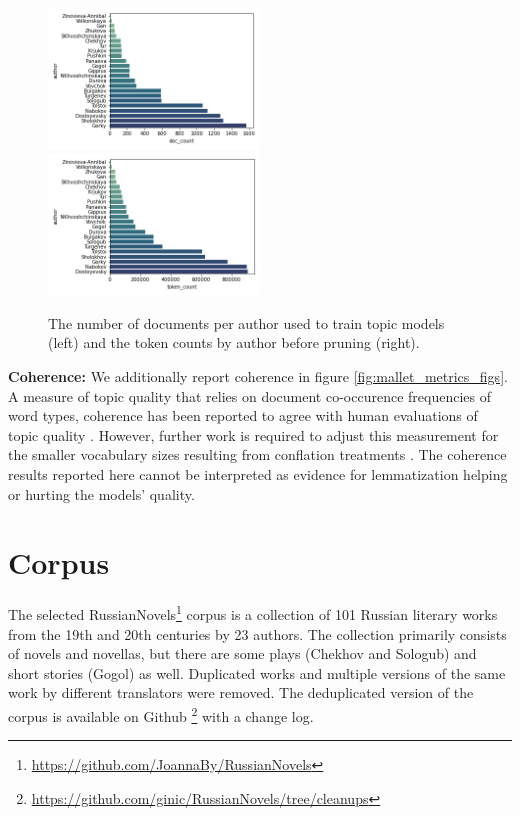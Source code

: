 \documentclass[11pt,a4paper]{article}
\begin{document}
\begin{figure}[th!]
    \includegraphics[width=0.5\textwidth]{document_count_by_author.png}
    \includegraphics[width=0.5\textwidth]{token_count_by_author.png}
    \caption{The number of documents per author used to train topic models (left) and the token counts by author before pruning (right).}
    \label{fig:docsByAuthor}
\end{figure}

\textbf{Coherence:} We additionally report coherence in figure \ref{fig:mallet_metrics_figs}. A measure of topic quality that relies on document co-occurence frequencies of word types, coherence has been reported to agree with human evaluations of topic quality \cite{mimno2011optimizing}. However, further work is required to adjust this measurement for the smaller vocabulary sizes resulting from conflation treatments \cite{schofield-mimno-2016-comparing}. The coherence results reported here cannot be interpreted as evidence for lemmatization helping or hurting the models' quality.

\section{Corpus}
The selected RussianNovels\footnote{\url{https://github.com/JoannaBy/RussianNovels}} corpus is a collection of 101 Russian literary works from the 19th and 20th centuries by 23 authors. The collection primarily consists of novels and novellas, but there are some plays (Chekhov and Sologub) and short stories (Gogol) as well. Duplicated works and multiple versions of the same work by different translators were removed. The deduplicated version of the corpus is available on Github \footnote{\url{https://github.com/ginic/RussianNovels/tree/cleanups}} with a change log.
\end{document}
